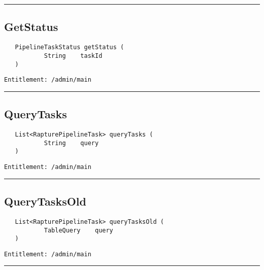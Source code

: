 \rule{12cm}{2pt}
\subsection{GetStatus}
\label{Api:GetStatus}
\begin{verbatim}
   PipelineTaskStatus getStatus (
           String    taskId
   )
\end{verbatim}
\begin{Verbatim}[fontsize=\small, formatcom=\color{Maroon}]
  Entitlement: /admin/main
\end{Verbatim}



\rule{12cm}{2pt}
\subsection{QueryTasks}
\label{Api:QueryTasks}
\begin{verbatim}
   List<RapturePipelineTask> queryTasks (
           String    query
   )
\end{verbatim}
\begin{Verbatim}[fontsize=\small, formatcom=\color{Maroon}]
  Entitlement: /admin/main
\end{Verbatim}



\rule{12cm}{2pt}
\subsection{QueryTasksOld}
\label{Api:QueryTasksOld}
\begin{verbatim}
   List<RapturePipelineTask> queryTasksOld (
           TableQuery    query
   )
\end{verbatim}
\begin{Verbatim}[fontsize=\small, formatcom=\color{Maroon}]
  Entitlement: /admin/main
\end{Verbatim}



\rule{12cm}{2pt}
